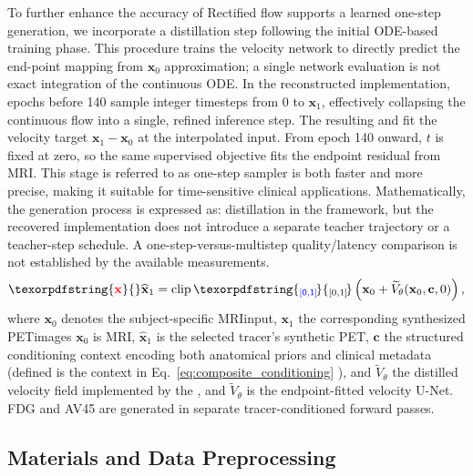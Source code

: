 \documentclass{article}
\providecommand{\DIFaddtex}[1]{{\protect\color{blue} \sf #1}} %
\providecommand{\DIFdeltex}[1]{{\protect\color{red} \scriptsize #1}} %
\providecommand{\DIFaddbegin}{} %
\providecommand{\DIFaddend}{} %
\providecommand{\DIFdelbegin}{} %
\providecommand{\DIFdelend}{} %
\providecommand{\DIFadd}[1]{\texorpdfstring{\DIFaddtex{#1}}{#1}} %
\providecommand{\DIFdel}[1]{\texorpdfstring{\DIFdeltex{#1}}{}} %
\newcommand{\DIFscaledelfig}{0.5}
\newlength{\DIFdelgraphicswidth} %
\newlength{\DIFdelgraphicsheight} %
\newcommand{\DIFaddincludegraphics}[2][]{{\color{blue}\fbox{\DIFOincludegraphics[#1]{#2}}}} %
\newcommand{\DIFdelincludegraphics}[2][]{%
\sbox{\DIFdelgraphicsbox}{\DIFOincludegraphics[#1]{#2}}%
\settoboxwidth{\DIFdelgraphicswidth}{\DIFdelgraphicsbox} %
\settoboxtotalheight{\DIFdelgraphicsheight}{\DIFdelgraphicsbox} %
\scalebox{\DIFscaledelfig}{%
\parbox[b]{\DIFdelgraphicswidth}{\usebox{\DIFdelgraphicsbox}\\[-\baselineskip] \rule{\DIFdelgraphicswidth}{0em}}\llap{\resizebox{\DIFdelgraphicswidth}{\DIFdelgraphicsheight}{%
\setlength{\unitlength}{\DIFdelgraphicswidth}%
\begin{picture}(1,1)%
\thicklines\linethickness{2pt} %
{\color[rgb]{1,0,0}\put(0,0){\framebox(1,1){}}}%
{\color[rgb]{1,0,0}\put(0,0){\line( 1,1){1}}}%
{\color[rgb]{1,0,0}\put(0,1){\line(1,-1){1}}}%
\end{picture}%
}\hspace*{3pt}}} %
} %
\DeclareRobustCommand{\DIFaddbegin}{\DIFOaddbegin \let\includegraphics\DIFaddincludegraphics} %
\DeclareRobustCommand{\DIFaddend}{\DIFOaddend \let\includegraphics\DIFOincludegraphics} %
\DeclareRobustCommand{\DIFdelbegin}{\DIFOdelbegin \let\includegraphics\DIFdelincludegraphics} %
\DeclareRobustCommand{\DIFdelend}{\DIFOaddend \let\includegraphics\DIFOincludegraphics} %
\begin{document}
\DIFdel{To further enhance the accuracy of }\DIFdelend \DIFaddbegin \DIFadd{Rectified flow supports a learned }\DIFaddend one-step \DIFdelbegin \DIFdel{generation, we incorporate a distillation step following the initial ODE-based training phase. This procedure trains the velocity network to directly predict the end-point mapping from $\mathbf{x}_0$ }\DIFdelend \DIFaddbegin \DIFadd{approximation; a single network evaluation is not exact integration of the continuous ODE. In the reconstructed implementation, epochs before 140 sample integer timesteps from 0 }\DIFaddend to \DIFdelbegin \DIFdel{$\mathbf{x}_1$, effectively collapsing the continuous flow into a single, refined inference step. The resulting }\DIFdelend \DIFaddbegin \DIFadd{999 and fit the velocity target $\mathbf{x}_1-\mathbf{x}_0$ at the interpolated input. From epoch 140 onward, $t$ is fixed at zero, so the same supervised objective fits the endpoint residual from MRI. This stage is referred to as }\DIFaddend one-step \DIFdelbegin \DIFdel{sampler is both faster and more precise, making it suitable for time-sensitive clinical applications. Mathematically, the generation process is expressed as:
}\DIFdelend \DIFaddbegin \DIFadd{distillation in the framework, but the recovered implementation does not introduce a separate teacher trajectory or a teacher-step schedule. A one-step-versus-multistep quality/latency comparison is not established by the available measurements.
}\DIFaddend \begin{equation}
\DIFdelbegin \DIFdel{\mathbf{x}}\DIFdelend \DIFaddbegin \widehat{\mathbf{x}}\DIFaddend _1=\DIFaddbegin \operatorname{clip}\DIFadd{_{[0,1]}\!}\left(\DIFaddend \mathbf{x}_0+\DIFdelbegin %
\DIFdelend \DIFaddbegin \widetilde{V}\DIFaddend _\theta(\mathbf{x}_0,\mathbf{c},0)\DIFaddbegin \right)\DIFaddend ,
\label{eq:onestep_generation}
\end{equation}
where \DIFdelbegin \DIFdel{$\mathbf{x}_0 $ denotes the subject-specific MRIinput, $\mathbf{x}_1 $ the corresponding synthesized PETimages}\DIFdelend \DIFaddbegin \DIFadd{$\mathbf{x}_0$ is MRI, $\widehat{\mathbf{x}}_1$ is the selected tracer's synthetic PET}\DIFaddend , $\mathbf{c}$ \DIFdelbegin \DIFdel{the structured conditioning context encoding both anatomical priors and clinical metadata (defined }\DIFdelend \DIFaddbegin \DIFadd{is the context }\DIFaddend in Eq.~\eqref{eq:composite_conditioning}\DIFdelbegin \DIFdel{), and $\tilde{V}_\theta$ the distilled velocity field implemented by the }\DIFdelend \DIFaddbegin \DIFadd{, and $\widetilde{V}_\theta$ is the endpoint-fitted }\DIFaddend velocity U-Net. \DIFaddbegin \DIFadd{FDG and AV45 are generated in separate tracer-conditioned forward passes.
}\DIFaddend \subsection{Materials and Data Preprocessing}
\end{document}
